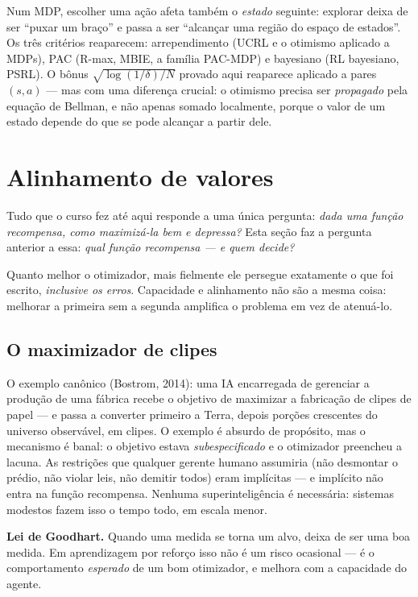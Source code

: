 \documentclass[11pt]{article}
\begin{document}
Num MDP, escolher uma ação afeta também o \emph{estado} seguinte: explorar
deixa de ser ``puxar um braço'' e passa a ser ``alcançar uma região do espaço
de estados''. Os três critérios reaparecem: arrependimento (UCRL e o otimismo
aplicado a MDPs), PAC (R-max, MBIE, a família PAC-MDP) e bayesiano (RL
bayesiano, PSRL). O bônus $\sqrt{\log(1/\delta)/N}$ provado aqui reaparece
aplicado a pares $(s,a)$ --- mas com uma diferença crucial: o otimismo precisa
ser \emph{propagado} pela equação de Bellman, e não apenas somado localmente,
porque o valor de um estado depende do que se pode alcançar a partir dele.

\section{Alinhamento de valores}
\label{sec:elo}

Tudo que o curso fez até aqui responde a uma única pergunta: \emph{dada uma
função recompensa, como maximizá-la bem e depressa?} Esta seção faz a pergunta
anterior a essa: \emph{qual função recompensa --- e quem decide?}

\begin{alertabox}
Quanto melhor o otimizador, mais fielmente ele persegue exatamente o que foi
escrito, \emph{inclusive os erros}. Capacidade e alinhamento não são a mesma
coisa: melhorar a primeira sem a segunda amplifica o problema em vez de
atenuá-lo.
\end{alertabox}

\subsection*{O maximizador de clipes}

O exemplo canônico (Bostrom, 2014): uma IA encarregada de gerenciar a produção
de uma fábrica recebe o objetivo de maximizar a fabricação de clipes de papel
--- e passa a converter primeiro a Terra, depois porções crescentes do universo
observável, em clipes. O exemplo é absurdo de propósito, mas o mecanismo é
banal: o objetivo estava \emph{subespecificado} e o otimizador preencheu a
lacuna. As restrições que qualquer gerente humano assumiria (não desmontar o
prédio, não violar leis, não demitir todos) eram implícitas --- e implícito não
entra na função recompensa. Nenhuma superinteligência é necessária: sistemas
modestos fazem isso o tempo todo, em escala menor.

\begin{ideiabox}
\textbf{Lei de Goodhart.} Quando uma medida se torna um alvo, deixa de ser uma
boa medida. Em aprendizagem por reforço isso não é um risco ocasional --- é o
comportamento \emph{esperado} de um bom otimizador, e melhora com a capacidade
do agente.
\end{ideiabox}
\end{document}
